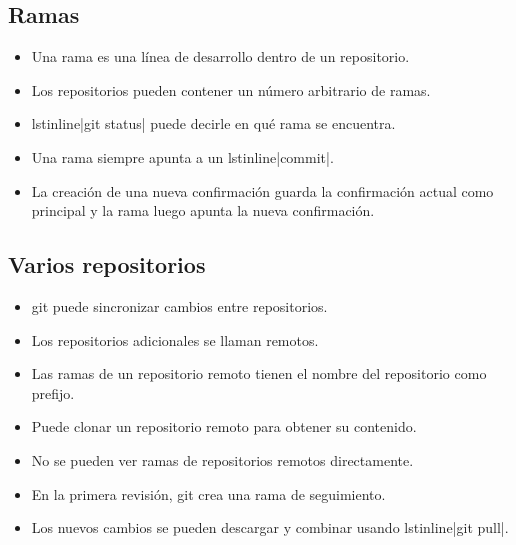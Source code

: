 \subsection{Ramas}

\begin{itemize}
	\item Una rama es una línea de desarrollo dentro de un repositorio.
	\item Los repositorios pueden contener un número arbitrario de ramas.
	\item lstinline|git status| puede decirle en qué rama se encuentra.
	\item Una rama siempre apunta a un lstinline|commit|.
	\item La creación de una nueva confirmación guarda la confirmación actual como principal y la rama luego apunta la nueva confirmación.
\end{itemize}

\subsection{Varios repositorios}

\begin{itemize}
	\item git puede sincronizar cambios entre repositorios.
	\item Los repositorios adicionales se llaman remotos.
	\item Las ramas de un repositorio remoto tienen el nombre del repositorio como prefijo.
	\item Puede clonar un repositorio remoto para obtener su contenido.
	\item No se pueden ver ramas de repositorios remotos directamente.
	\item En la primera revisión, git crea una rama de seguimiento.
	\item Los nuevos cambios se pueden descargar y combinar usando lstinline|git pull|.
\end{itemize}

